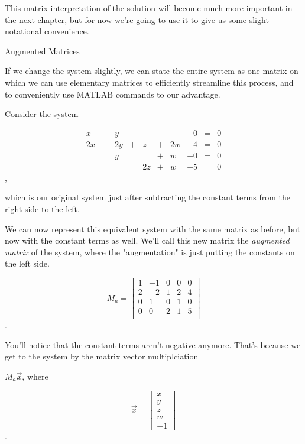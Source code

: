 \documentclass{ximera}
\begin{document}
This matrix-interpretation of the solution will become much more important in the next chapter, but for now we're going to use it to give us some slight notational convenience. 

\begin{remark}{Augmented Matrices}

If we change the system slightly, we can state the entire system as one matrix on which we can use elementary matrices to efficiently streamline this process, and to conveniently use MATLAB commands to our advantage.

Consider the system 

\begin{equation}
  \begin{array}{cccccccccc}
      x &- &y&&&&&-0&= &0 \\
     2x& -&2y&+&z&+&2w&-4&=&0\\
     & &y&&&+&w&-0&=&0\\
     & &&&2z&+&w&-5&=&0
  \end{array}
\end{equation}, 

which is our original system just after subtracting the constant terms from the right side to the left.

We can now represent this equivalent system with the same matrix as before, but now with the constant terms as well. We'll call this new matrix the \emph{augmented matrix} of the system, where the "augmentation" is just putting the constants on the left side.

\begin{equation}
  M_a=\begin{bmatrix}
    1 & -1 & 0 & 0 & 0\\
    2 & -2 & 1 & 2 & 4\\
    0 & 1  & 0 & 1 & 0\\
    0 & 0  & 2 & 1 & 5\\
  \end{bmatrix}
\end{equation}.

You'll notice that the constant terms aren't negative anymore. That's because we get to the system by the matrix vector multiplciation 

$M_a\vec{x}$, where 

\begin{equation}
  \vec{x}=\begin{bmatrix}
    x \\
    y  \\
    z \\
    w \\
    -1  
  \end{bmatrix}
\end{equation}.


\end{remark}
\end{document}

